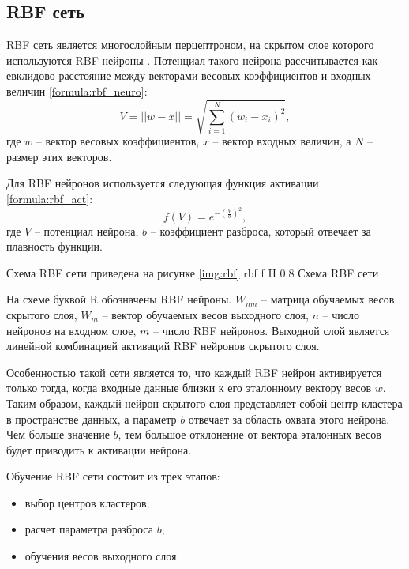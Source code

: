 \subsection{RBF сеть}
RBF сеть является многослойным перцептроном, на скрытом слое которого используются RBF нейроны \cite{jiang2022efficient}.
Потенциал такого нейрона рассчитывается как евклидово расстояние между векторами весовых коэффициентов и входных величин \ref{formula:rbf_neuro}:
\begin{equation}\label{formula:rbf_neuro}
	V = ||w - x|| = \sqrt{\sum_{i=1}^{N}(w_i-x_i)^2},
\end{equation}
где $w$ -- вектор весовых коэффициентов, $x$ -- вектор входных величин, а $N$ -- размер этих векторов.

Для RBF нейронов используется следующая функция активации \ref{formula:rbf_act}:
\begin{equation}\label{formula:rbf_act}
	f(V) = e^{-(\frac{V}{b})^2},
\end{equation}
где $V$ -- потенциал нейрона, $b$ -- коэффициент разброса, который отвечает за плавность функции.

Схема RBF сети приведена на рисунке \ref{img:rbf}
{rbf} %
{f} %
{H} %
{0.8\textwidth} %
{Схема RBF сети} %

На схеме буквой R обозначены RBF нейроны. $W_{nm}$ -- матрица обучаемых весов скрытого слоя, $W_m$ -- вектор обучаемых весов выходного слоя, $n$ -- число нейронов на входном слое, $m$ -- число RBF нейронов.
Выходной слой является линейной комбинацией активаций RBF нейронов скрытого слоя.

Особенностью такой сети является то, что каждый RBF нейрон активируется только тогда, когда входные данные близки к его эталонному вектору весов $w$.
Таким образом, каждый нейрон скрытого слоя представляет собой центр кластера в пространстве данных, а параметр $b$ отвечает за область охвата этого нейрона.
Чем больше значение $b$, тем большое отклонение от вектора эталонных весов будет приводить к активации нейрона.

Обучение RBF сети состоит из трех этапов:
\begin{itemize}
	\item выбор центров кластеров;
	\item расчет параметра разброса $b$;
	\item обучения весов выходного слоя.
\end{itemize}

